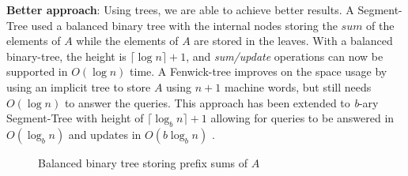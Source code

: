 \par
\textbf{Better approach}: Using trees, we are able to achieve better results. A Segment-Tree \cite{Bentley_1977} used a balanced binary tree with the internal nodes storing the $sum$ of the elements of $A$ while the elements of $A$ are stored in the leaves. With a balanced binary-tree, the height is $\lceil \log n \rceil + 1$, and \textit{sum/update} operations can now be supported in $O(\log n)$ time. A Fenwick-tree \cite{Fenwick_1994} improves on the space usage by using an implicit tree to store $A$ using $n + 1$ machine words, but still needs $O(\log n)$ to answer the queries. This approach has been extended to \textit{b}-ary Segment-Tree with height of $\lceil \log_b n \rceil + 1$ allowing for queries to be answered in $O(\log_b n)$ and updates in $O(b\log_b n)$ \cite{Dietz_1989, Hon_2011, Patrascu_2006, Raman_2001}.
\begin{figure}[H]
\centering
{}
\caption{Balanced binary tree storing prefix sums of $A$}
\label{fig:segment_tree}
\end{figure}
\FloatBarrier
